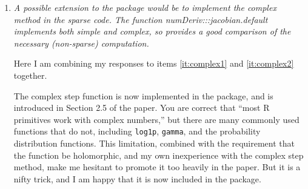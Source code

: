 \documentclass{article}
\newcommand{\code}[1]{\texttt{#1}}
\newcommand{\func}[1]{\code{#1}}
\newenvironment{revQuote}{\itshape}{\vspace{\baselineskip}}
\newenvironment{response}{\normalfont}{\vspace{\baselineskip}}
\begin{document}
\begin{enumerate}[align=left]
\begin{revQuote}
(Code removed)


Another very interesting comparison is

(Code removed)

The complex step derivative provides extremely accurate approximations with
a  number of function evaluation similar to the simple method. (This does
not seem to be anticipated by footnote 1 in the paper.) However, the method
imposes some serious requirements on the function. (Something like complex
analytic even though the user may only be interested in the real part.) The
code also has to accept complex arguments and return the complex result.
Fortunately most R primitive work with complex numbers so the code
requirement may happen accidentally, which can be partly verified by

binary.grad(P + 0+1i, data=binary, priors=priors, order.row=order.row)

returning a complex result. (This does not rule out all possible problems.)

As I recall, sums, multiplication, and exponentiation are all complex
analytic, so it would not be too surprising if the example in the paper is
too, but I have not analyzed that. However, based on the result being very
good, it seems highly likely.
  \end{revQuote}

  \begin{response}
    See response to Item \ref{it:complex2}
  \end{response}


\item\label{it:complex2} \begin{revQuote}
A possible extension to the package would be to implement the complex
method in the sparse code. The function numDeriv:::jacobian.default
implements both simple and complex, so provides a good comparison of the
necessary (non-sparse) computation. 

  \end{revQuote}

\begin{response}

Here I am combining my responses to items \ref{it:complex1} and
\ref{it:complex2} together.

  The complex step function is now implemented in the package, and is
  introduced in Section 2.5 of the paper.  You
  are correct that ``most R primitives work with complex numbers,''
  but there are many commonly used functions that do not, including 
  \func{log1p}, \func{gamma}, and the probability distribution
  functions. This limitation, combined with the requirement that the function be
  holomorphic, and my own inexperience with the complex step method, make
  me hesitant to promote it too heavily in the paper. But it is a nifty
  trick, and I am happy that it is now included in the package.
 

\end{response}
\end{enumerate}
\end{document}
